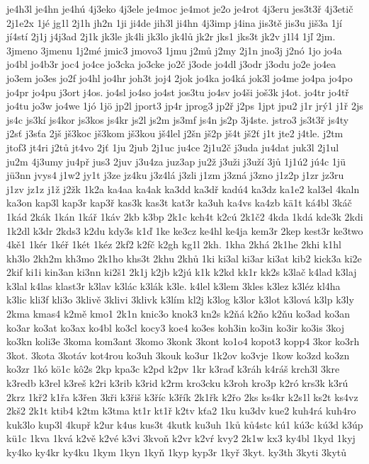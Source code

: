 {je4h3l
je4hn
je4hú
4j3eko
4j3ele
je4moc
je4mot
je2o
je4rot
4j3eru
jes3t3ř
4j3etič
2j1e2x
1jé
jg1l
2j1h
jh2n
1ji
ji4de
jih3l
ji4hn
4j3imp
j4ina
jis3tě
jis3u
jiš3a
1jí
jí4stí
2j1j
j4j3ad
2j1k
jk3le
jk4li
jk3lo
jk4lů
jk2r
jks1
jks3t
jk2v
j1l4
1jľ
2jm.
3jmeno
3jmenu
1j2mé
jmic3
jmovo3
1jmu
j2mů
j2my
2j1n
jno3j
j2nó
1jo
jo4a
jo4bl
jo4b3r
joc4
jo4ce
jo3cka
jo3cke
jo2č
j3ode
jo4dl
j3odr
j3odu
jo2e
jo4ea
jo3em
jo3es
jo2f
jo4hl
jo4hr
joh3t
joj4
2jok
jo4ka
jo4ká
jok3l
jo4me
jo4pa
jo4po
jo4pr
jo4pu
j3ort
j4os.
jo4sl
jo4so
jo4st
jos3tu
jo4sv
jo4ši
još3k
j4ot.
jo4tr
jo4tř
jo4tu
jo3w
jo4we
1jó
1jö
jp2l
jport3
jp4r
jprog3
jp2ř
j2ps
1jpt
jpu2
j1r
jrý1
j1ř
2js
js4c
js3kí
js4kor
js3kos
js4kr
js2l
js2m
js3mf
js4n
js2p
3j4ste.
jstro3
js3t3ř
js4ty
j2sť
j3sťa
2jš
jš3koc
jš3kom
jš3kou
jš4lel
j2šn
jš2p
jš4t
jš2ť
j1t
jte2
j4tle.
j2tm
jtof3
jt4ri
j2tů
jt4vo
2jť
1ju
2jub
2j1uc
ju4ce
2j1u2č
j3uda
ju4dat
juk3l
2j1ul
ju2m
4j3umy
ju4př
jus3
2juv
j3u4za
juz3ap
ju2ž
j3uži
j3uží
3jů
1j1ú2
jú4c
1jü
jü3nn
jvys4
j1w2
jy1t
j3ze
jz4ku
j3z4lá
j3zli
j1zm
j3zná
j3zno
j1z2p
j1zr
jz3ru
j1zv
jz1z
j1ž
j2žk
1k2a
ka4aa
ka4ak
ka3dd
ka3dř
kadú4
ka3dz
ka1e2
kal3el
4kaln
ka3on
kap3l
kap3r
kap3ř
kas3k
kas3t
kat3r
ka3uh
ka4vs
ka4zb
kä1t
ká4bl
3káč
1kád
2kák
1kán
1kář
1káv
2kb
k3bp
2k1c
kch4t
k2cú
2k1č2
4kda
1kdá
kde3k
2kdi
1k2dl
k3dr
2kds3
k2du
kdy3s
k1ď
1ke
ke3cz
ke4hl
ke4ja
kem3r
2kep
kest3r
ke3two
4kě1
1kér
1kéř
1két
1kéz
2kf2
k2fč
k2gh
kg1l
2kh.
1kha
2khá
2k1he
2khi
k1hl
kh3lo
2kh2m
kh3mo
2k1ho
khs3t
2khu
2khů
1ki
ki3al
ki3ar
ki3at
kib2
kick3a
ki2e
2kif
ki1i
kin3an
ki3nn
ki2š1
2k1j
k2jb
k2jú
k1k
k2kd
kk1r
kk2s
k3lač
k4lad
k3laj
k3lal
k4las
klast3r
k3lav
k3lác
k3lák
k3le.
k4lel
k3lem
3kles
k3lez
k3léz
kl4ha
k3lic
kli3f
kli3o
3klivě
3klivi
3klivk
k3lím
kl2j
k3log
k3lor
k3lot
k3lová
k3lp
k3ly
2kma
kmas4
k2mě
kmo1
2k1n
knic3o
knok3
kn2s
k2ňá
k2ňo
k2ňu
ko3ad
ko3an
ko3ar
ko3at
ko3ax
ko4bl
ko3cl
kocy3
koe4
ko3es
koh3in
ko3in
ko3ir
ko3is
3koj
ko3kn
koli3e
3koma
kom3ant
3komo
3konk
3kont
ko1o4
kopot3
kopp4
3kor
ko3rh
3kot.
3kota
3kotáv
kot4rou
ko3uh
3kouk
ko3ur
1k2ov
ko3vje
1kow
ko3zd
ko3zn
ko3zr
1kó
kö1c
kô2s
2kp
kpa3c
k2pd
k2pv
1kr
k3raď
k3ráh
k4ráš
krch3l
3kre
k3redb
k3rel
k3reš
k2ri
k3rib
k3rid
k2rm
kro3cku
k3roh
kro3p
k2ró
krs3k
k3rú
2krz
1kř2
k1řa
k3řen
3kři
k3řiš
k3říc
k3řík
2k1řk
k2řo
2ks
ks4kr
k2s1l
ks2t
ks4vz
2kš2
2k1t
ktib4
k2tm
k3tma
kt1r
kt1ř
k2tv
kťa2
1ku
ku3dv
kue2
kuh4rá
kuh4ro
kuk3lo
kup3l
4kupř
k2ur
k4us
kus3t
4kutk
ku3uh
1ků
ků4stc
kú1
kú3c
kú3d
k3úp
kü1c
1kva
1kvá
k2vě
k2vé
k3vi
3kvoň
k2vr
k2vŕ
kvy2
2k1w
kx3
ky4bl
1kyd
1kyj
ky4ko
ky4kr
ky4ku
1kym
1kyn
1kyň
1kyp
kyp3r
1kyř
3kyt.
ky3th
3kyti
3kytů
}
